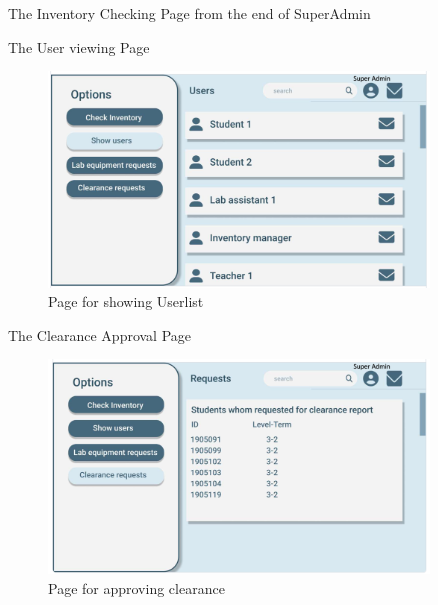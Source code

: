 \documentclass[20pt]{beamer}
\numberwithin{figure}{section}
\begin{document}
\begin{frame}{The Inventory Checking Page from the end of SuperAdmin}
\begin{figure}
\begin{minipage}[b]{0.45\textwidth}
        \end{minipage}
        
    \end{figure}

\end{frame}

\begin{frame}{The User viewing Page}

     \begin{figure}
        \centering
        \includegraphics[width= 0.9\textwidth , height= 0.5\paperheight]{SuperAdminShowUser.png}
        \caption{Page for showing Userlist}
        \label{fig:66}
    \end{figure}

\end{frame}

\begin{frame}{The Clearance Approval Page}

     \begin{figure}
        \centering
        \includegraphics[width= 0.9\textwidth , height= 0.5\paperheight]{SuperAdminGiveClearance.png}
        \caption{Page for approving clearance}
        \label{fig:67}
    \end{figure}

\end{frame}
\end{document}
